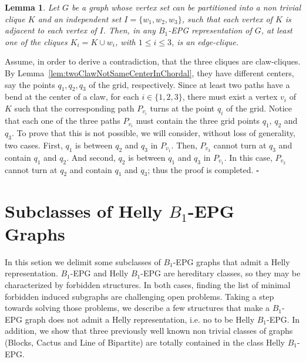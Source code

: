 \documentclass[9pt]{entcs}
\newtheorem{lema}{Lemma}[section]
\begin{document}
\begin{lema}\label{lem:3cliquesNotClaw}
Let $G$ be a graph whose vertex set  can be
partitioned into a non trivial clique $K$ and an independent set $I=\{w_1,w_2,w_3\}$, such that each vertex of $K$ is adjacent to each vertex of $I$. Then, in any $B_1$-EPG representation of $G$, at least one of the cliques  $K_i = K \cup w_i$, with $1 \leq i \leq 3$,  is an edge-clique. 
\end{lema}

\begin{pf}
Assume, in order to derive a contradiction, that the three cliques are claw-cliques. By Lemma~\ref{lem:twoClawNotSameCenterInChordal}, they have different centers, say the points $q_1, q_2, q_3$ of the grid, respectively. Since at least two paths have a bend at the center of a claw, for each $i\in\{1,2,3\}$,   there must exist a vertex
  $v_i$ of $K$ such that the corresponding path $P_{v_i}$ turns at the point $q_i$ of the grid.  Notice that each one of the three paths $P_{v_i}$
  must contain  the three grid points $q_1$, $q_2$ and $q_3$. To prove that this is not possible, we will consider, without loss of generality, two cases.
  First,  $q_1$ is between $q_2$ and $q_3$ in $P_{v_1}$. Then, $P_{v_3}$ cannot turn at $q_3$ and contain $q_1$ and $q_2$.   And second,
  $q_2$ is between $q_1$ and $q_3$ in $P_{v_1}$. In this case, $P_{v_2}$ cannot turn at $q_2$ and contain $q_1$ and $q_3$; thus the proof is completed.
 $\square$
\end{pf}





\section{Subclasses of Helly $B_1$-EPG Graphs}

In this setion we delimit some  subclasses of $B_1$-EPG graphs that admit a Helly representation. $B_1$-EPG and Helly $B_1$-EPG 
are hereditary classes, so they may be characterized by forbidden structures. 
In both cases, finding the list of minimal forbidden induced subgraphs are challenging open problems.
Taking a step towards solving
those problems,  we describe a few structures that make a $B_1$-EPG graph does not admit a Helly representation, i.e. no to be  Helly $B_1$-EPG. In addition,
we show that three previously well known non trivial classes of graphs (Blocks, Cactus and Line of Bipartite) are totally contained in the class Helly $B_1$-EPG.
\end{document}
